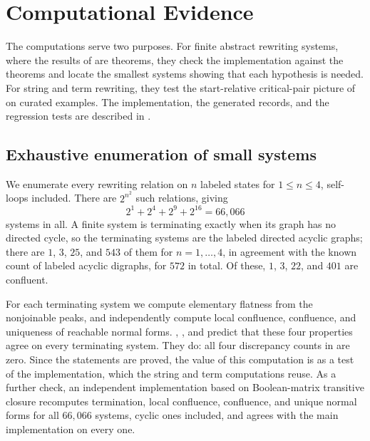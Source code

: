 \section{Computational Evidence}
\label{sec:computational-bridge}

The computations serve two purposes. For finite abstract rewriting systems, where the results of  are theorems, they check the implementation against the theorems and locate the smallest systems showing that each hypothesis is needed. For string and term rewriting, they test the start-relative critical-pair picture of  on curated examples. The implementation, the generated records, and the regression tests are described in .

\subsection{Exhaustive enumeration of small systems}
\label{subsec:exhaustive-finite-ars-audit}

We enumerate every rewriting relation on $n$ labeled states for $1 \leq n \leq 4$, self-loops included. There are $2^{n^2}$ such relations, giving
\[
2^{1} + 2^{4} + 2^{9} + 2^{16} = 66{,}066
\]
systems in all. A finite system is terminating exactly when its graph has no directed cycle, so the terminating systems are the labeled directed acyclic graphs; there are $1$, $3$, $25$, and $543$ of them for $n = 1,\dots,4$, in agreement with the known count of labeled acyclic digraphs, for $572$ in total. Of these, $1$, $3$, $22$, and $401$ are confluent.

For each terminating system we compute elementary flatness from the nonjoinable peaks, and independently compute local confluence, confluence, and uniqueness of reachable normal forms. , , and  predict that these four properties agree on every terminating system. They do: all four discrepancy counts in  are zero. Since the statements are proved, the value of this computation is as a test of the implementation, which the string and term computations reuse. As a further check, an independent implementation based on Boolean-matrix transitive closure recomputes termination, local confluence, confluence, and unique normal forms for all $66{,}066$ systems, cyclic ones included, and agrees with the main implementation on every one.

